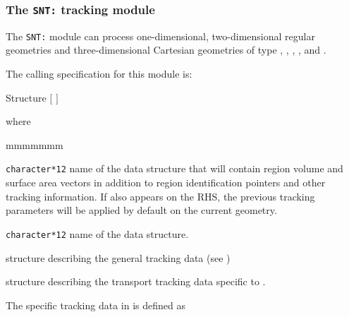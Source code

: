 \subsubsection{The {\tt SNT:} tracking module}\label{sect:SNData}

The {\tt SNT:} module can process one-dimensional, two-dimensional regular geometries and three-dimensional Cartesian geometries
of type , , , ,  and .

\vskip 0.2cm

The calling specification for this module is:

\begin{DataStructure}{Structure }
\moc{:=}  $[$  $]$ 
 \moc{::}   
\end{DataStructure}

\noindent  where
\begin{ListeDeDescription}{mmmmmmm}

\item[\dusa{TRKNAM}] {\tt character*12} name of the  data
structure that will contain region volume and surface area vectors in
addition to region identification pointers and other tracking information.
If  also appears on the RHS, the previous tracking 
parameters will be applied by default on the current geometry.

\item[\dusa{GEONAM}] {\tt character*12} name of the  data
structure.

\item[\dstr{desctrack}] structure describing the general tracking data (see
)

\item[\dstr{descsn}] structure describing the transport tracking data
specific to .

\end{ListeDeDescription}

\vskip 0.2cm

The  specific tracking data in  is defined as

